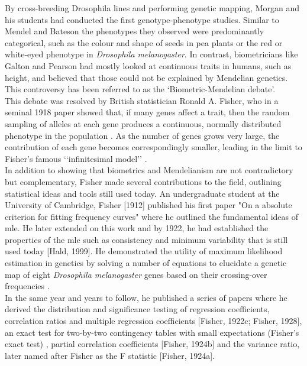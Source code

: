 By cross-breeding Drosophila lines and performing genetic mapping, Morgan and his students had conducted the first genotype-phenotype studies. 
Similar to Mendel and Bateson the phenotypes they observed were predominantly categorical, such as the colour and shape of seeds in pea plants or the red or white-eyed phenotype in \textit{Drosophila melanogaster}. 
In contrast, biometricians like Galton and Pearson had mostly looked at continuous traits in humans, such as height, and believed that those could not be explained by Mendelian genetics.
This controversy has been referred to as the ‘Biometric-Mendelian debate’.\\ 

This debate was resolved by British statistician Ronald A. Fisher, who in a seminal 1918 paper showed that, if many genes affect a trait, then the random sampling of alleles at each gene produces a continuous, normally distributed phenotype in the population \cite{fisher1919xv}. 
As the number of genes grows very large, the contribution of each gene becomes correspondingly smaller, leading in the limit to Fisher’s famous ‘‘infinitesimal model’’ \cite{barton2017infinitesimal}.\\

In addition to showing that biometrics and Mendelianism are not contradictory but complementary, Fisher made several contributions to the field, outlining statistical ideas and tools still used today. 
An undergraduate student at the University of Cambridge, Fisher [1912] published his first paper "On a absolute criterion for fitting frequency curves" where he outlined the fundamental ideas of \gls{mle}. 
He later extended on this work and by 1922, he had established the properties of the \gls{mle} such as consistency and minimum variability \cite{fisher1922mathematical} that is still used today [Hald, 1999]. 
He demonstrated the utility of maximum likelihood estimation in genetics by solving a number of equations to elucidate a genetic map of eight \textit{Drosophila melanogaster} genes based on their crossing-over frequencies \cite{fisher1922systematic}.\\ 

In the same year and years to follow, he published a series of papers where he derived the distribution and significance testing of regression coefficients, correlation ratios and multiple regression coefficients [Fisher, 1922c; Fisher, 1928], an exact test for two-by-two contingency tables with small expectations (Fisher’s exact test) \cite{fisher1922interpretation}, partial correlation coefficients [Fisher, 1924b] and the variance ratio, later named after Fisher as the F statistic [Fisher, 1924a]. 


